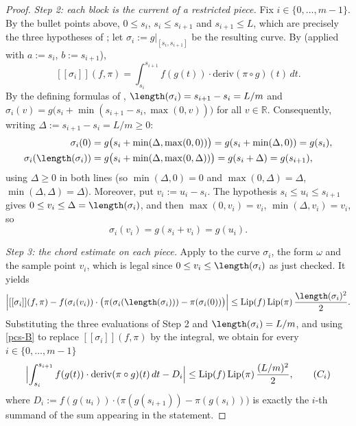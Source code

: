 \begin{proof}
  \emph{Step 2: each block is the current of a restricted piece.} Fix $i \in \{0,\dots,m-1\}$. By
  the bullet points above, $0 \le s_i$, $s_i \le s_{i+1}$ and $s_{i+1} \le L$, which are precisely
  the three hypotheses of ; let $\sigma_i := g|_{[s_i,s_{i+1}]}$ be the
  resulting curve. By  (applied with $a := s_i$, $b := s_{i+1}$),
  \begin{equation}\label{pcs-B}
    [[\sigma_i]](f,\pi) = \int_{s_i}^{s_{i+1}} f(g(t)) \cdot \mathrm{deriv}(\pi \circ g)(t)\,dt
    . \tag{B}
  \end{equation}
  By the defining formulas of , $\length(\sigma_i) = s_{i+1} - s_i = L/m$
  and $\sigma_i(v) = g\bigl(s_i + \min(s_{i+1}-s_i, \max(0,v))\bigr)$ for all $v \in \mathbb{R}$.
  Consequently, writing $\Delta := s_{i+1} - s_i = L/m \ge 0$:
  \begin{align*}
    \sigma_i(0) &= g\bigl(s_i + \min(\Delta, \max(0,0))\bigr) = g(s_i + \min(\Delta,0)) = g(s_i),\\
    \sigma_i(\length(\sigma_i)) &= g\bigl(s_i + \min(\Delta,\max(0,\Delta))\bigr)
      = g(s_i + \Delta) = g(s_{i+1}),
  \end{align*}
  using $\Delta \ge 0$ in both lines (so $\min(\Delta,0) = 0$ and $\max(0,\Delta) = \Delta$,
  $\min(\Delta,\Delta)=\Delta$). Moreover, put $v_i := u_i - s_i$. The hypothesis
  $s_i \le u_i \le s_{i+1}$ gives $0 \le v_i \le \Delta = \length(\sigma_i)$, and then
  $\max(0,v_i) = v_i$, $\min(\Delta,v_i) = v_i$, so
  \[
    \sigma_i(v_i) = g(s_i + v_i) = g(u_i)
    .
  \]

  \emph{Step 3: the chord estimate on each piece.} Apply  to the
  curve $\sigma_i$, the form $\omega$ and the sample point $v_i$, which is legal since
  $0 \le v_i \le \length(\sigma_i)$ as just checked. It yields
  \[
    \Bigl| [[\sigma_i]](f,\pi) - f(\sigma_i(v_i)) \cdot
      \bigl(\pi(\sigma_i(\length(\sigma_i))) - \pi(\sigma_i(0))\bigr) \Bigr|
      \le \mathrm{Lip}(f)\,\mathrm{Lip}(\pi)\,\frac{\length(\sigma_i)^2}{2}
    .
  \]
  Substituting the three evaluations of Step 2 and $\length(\sigma_i) = L/m$, and using
  \eqref{pcs-B} to replace $[[\sigma_i]](f,\pi)$ by the integral, we obtain for every
  $i \in \{0,\dots,m-1\}$
  \begin{equation}\label{pcs-C}
    \Bigl| \int_{s_i}^{s_{i+1}} f(g(t)) \cdot \mathrm{deriv}(\pi \circ g)(t)\,dt - D_i \Bigr|
      \le \mathrm{Lip}(f)\,\mathrm{Lip}(\pi)\,\frac{(L/m)^2}{2}
    , \tag{$C_i$}
  \end{equation}
  where $D_i := f(g(u_i)) \cdot \bigl(\pi(g(s_{i+1})) - \pi(g(s_i))\bigr)$ is exactly the $i$-th
  summand of the sum appearing in the statement.


\end{proof}
